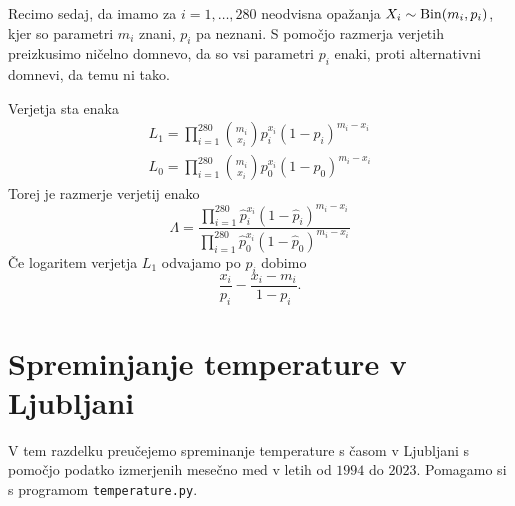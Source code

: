 \documentclass[12pt, a4paper]{article}
\begin{document}

Recimo sedaj, da imamo za $i = 1, \dots, 280$ neodvisna opažanja
$X_i \sim \operatorname{Bin}(m_i, p_i)$, kjer so parametri $m_i$ znani, 
$p_i$ pa neznani. S pomočjo razmerja verjetih preizkusimo 
ničelno domnevo, da so vsi parametri $p_i$ enaki, proti 
alternativni domnevi, da temu ni tako.

Verjetja sta enaka
\begin{align*}
    L_1 = \prod_{i=1}^{280} \binom{m_i}{x_i}p_i^{x_i}(1-p_i)^{m_i-x_i} \\
    L_0 = \prod_{i=1}^{280} \binom{m_i}{x_i}p_0^{x_i}(1-p_0)^{m_i-x_i}   
\end{align*}
Torej je razmerje verjetij enako
\[
    \Lambda =
    \frac{\prod_{i=1}^{280} \hat p_i^{x_i}(1-\hat p_i)^{m_i-x_i}}
    {\prod_{i=1}^{280} \hat p_0^{x_i}(1-\hat p_0)^{m_i-x_i}}
\]
Če logaritem verjetja $L_1$ odvajamo po $p_i$ 
dobimo
\[
    \frac{x_i}{p_i} - \frac{x_i-m_i}{1-p_i}.
\]




\newpage

\section{Spreminjanje temperature v Ljubljani}

V tem razdelku preučejemo spreminanje temperature s časom v Ljubljani s 
pomočjo podatko izmerjenih mesečno med v letih od $1994$ do $2023$.
Pomagamo si s programom \texttt{temperature.py}.
\end{document}
